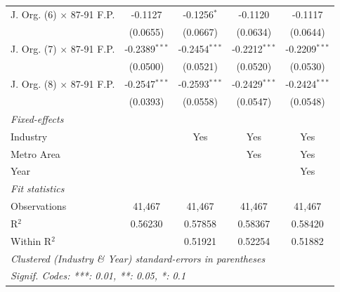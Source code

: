 \documentclass[
  12pt]{article}
\begin{document}
\begin{table}
\begin{minipage}[t]{\linewidth}
{\begin{tabular}{lcccc}
   J. Org. (6) $\times$ 87-91 F.P.  & -0.1127         & -0.1256$^{*}$   & -0.1120         & -0.1117\\   
                                    & (0.0655)        & (0.0667)        & (0.0634)        & (0.0644)\\   
   J. Org. (7) $\times$ 87-91 F.P.  & -0.2389$^{***}$ & -0.2454$^{***}$ & -0.2212$^{***}$ & -0.2209$^{***}$\\   
                                    & (0.0500)        & (0.0521)        & (0.0520)        & (0.0530)\\   
   J. Org. (8) $\times$ 87-91 F.P.  & -0.2547$^{***}$ & -0.2593$^{***}$ & -0.2429$^{***}$ & -0.2424$^{***}$\\   
                                    & (0.0393)        & (0.0558)        & (0.0547)        & (0.0548)\\   
   \midrule
   \emph{Fixed-effects}\\
   Industry                         &                 & Yes             & Yes             & Yes\\  
   Metro Area                       &                 &                 & Yes             & Yes\\  
   Year                             &                 &                 &                 & Yes\\  
   \midrule
   \emph{Fit statistics}\\
   Observations                     & 41,467          & 41,467          & 41,467          & 41,467\\  
   R$^2$                            & 0.56230         & 0.57858         & 0.58367         & 0.58420\\  
   Within R$^2$                     &                 & 0.51921         & 0.52254         & 0.51882\\  
   \midrule \midrule
   \multicolumn{5}{l}{\emph{Clustered (Industry \& Year) standard-errors in parentheses}}\\
   \multicolumn{5}{l}{\emph{Signif. Codes: ***: 0.01, **: 0.05, *: 0.1}}\\
\end{tabular}

}

\end{minipage}%
\newline
\begin{minipage}[t]{\linewidth}
\subcaption{\label{tbl-reg-fiscal-p-2}}

{\centering 

}
\end{minipage}
\end{table}
\end{document}

